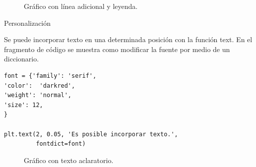 \documentclass[10pt]{beamer}
\begin{document}
\begin{frame}
	\begin{figure}
		\caption{Gráfico con línea adicional y leyenda.}
	\end{figure}
\end{frame}

\begin{frame}[fragile]{Personalización}

Se puede incorporar texto en una determinada posición con la función \alert{text}. En el fragmento de código se muestra como modificar la fuente por medio de un diccionario.

	\begin{verbatim}
font = {'family': 'serif',
'color':  'darkred',
'weight': 'normal',
'size': 12,
}

plt.text(2, 0.05, 'Es posible incorporar texto.',
		 fontdict=font)
	\end{verbatim}
\end{frame}

\begin{frame}
	\begin{figure}
		\caption{Gráfico con texto aclaratorio.}
	\end{figure}
\end{frame}
\end{document}
